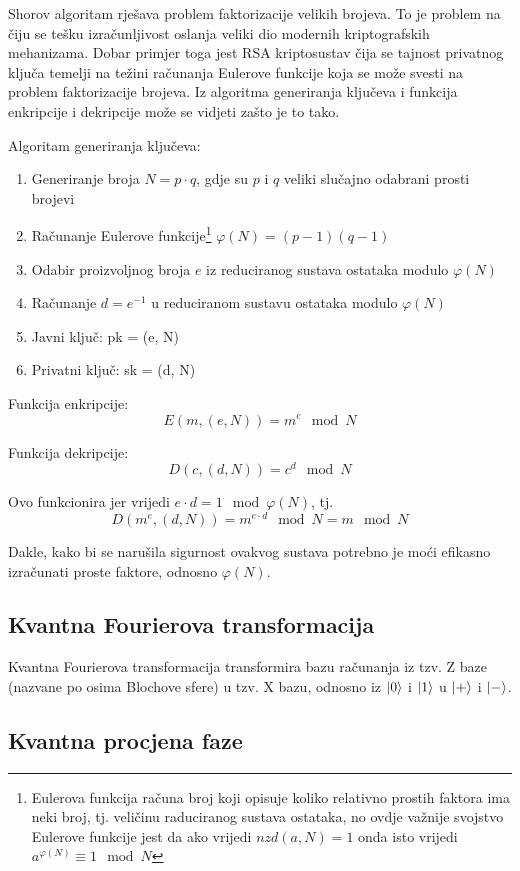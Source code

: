 Shorov algoritam rješava problem faktorizacije velikih brojeva. To je problem na čiju se tešku izračunljivost oslanja veliki dio modernih kriptografskih mehanizama. Dobar primjer toga jest RSA kriptosustav čija se tajnost privatnog ključa temelji na težini računanja Eulerove funkcije koja se može svesti na problem faktorizacije brojeva. Iz algoritma generiranja ključeva i funkcija enkripcije i dekripcije može se vidjeti zašto je to tako.

Algoritam generiranja ključeva:
\begin{enumerate}
\item Generiranje broja $N = p\cdot q$, gdje su $p$ i $q$ veliki slučajno odabrani prosti brojevi
\item Računanje Eulerove funkcije\footnote{Eulerova funkcija računa broj koji opisuje koliko relativno prostih faktora ima neki broj, tj. veličinu raduciranog sustava ostataka, no ovdje važnije svojstvo Eulerove funkcije jest da ako vrijedi $nzd(a, N) = 1$ onda isto vrijedi $a^{\varphi(N)} \equiv 1\mod N$ } $\varphi(N) = (p-1)(q-1)$
\item Odabir proizvoljnog broja $e$ iz reduciranog sustava ostataka modulo $\varphi(N)$
\item Računanje $d = e^{-1}$ u reduciranom sustavu ostataka modulo $\varphi(N)$
\item Javni ključ: pk = (e, N)
\item Privatni ključ: sk = (d, N)
\end{enumerate}

Funkcija enkripcije:
\[
E(m, (e,N)) = m^e \mod N
\]

Funkcija dekripcije:
\[
D(c,(d,N)) = c^d \mod N
\]

Ovo funkcionira jer vrijedi $e\cdot d = 1\mod \varphi(N)$, tj.
\[
D(m^e,(d,N)) = m^{e\cdot d} \mod N = m \mod N
\]

Dakle, kako bi se narušila sigurnost ovakvog sustava potrebno je moći efikasno izračunati proste faktore, odnosno $\varphi(N)$.

\subsection{Kvantna Fourierova transformacija}

Kvantna Fourierova transformacija transformira bazu računanja iz tzv. Z baze (nazvane po osima Blochove sfere) u tzv. X bazu, odnosno iz $\ket{0}$ i $\ket{1}$ u $\ket{+}$ i $\ket{-}$.

\subsection{Kvantna procjena faze}

